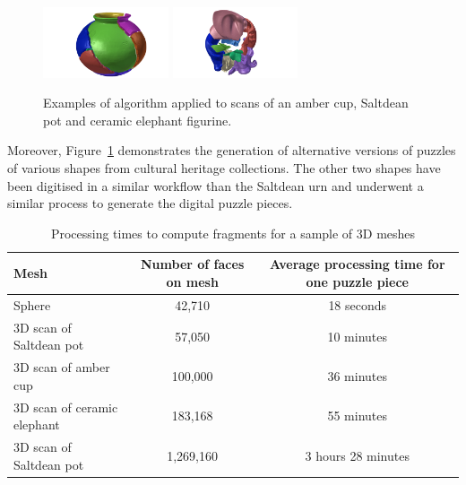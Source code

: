\documentclass[acmlarge,screen,dvipsnames]{acmart}
\begin{document}
\begin{figure}[htb]
  \includegraphics[width=0.33\textwidth]{images/saltdeanpuzzle4}%
  \includegraphics[width=0.33\textwidth]{images/elephantpuzzle4}
  \caption{\label{fig:three-shapes-with-different-fractures}%
    Examples of algorithm applied to scans of an amber cup, Saltdean pot and
    ceramic elephant figurine.}
\end{figure}

Moreover, Figure~\ref{fig:three-shapes-with-different-fractures}
demonstrates the generation of alternative versions of puzzles of
various shapes from cultural heritage collections. The other two
shapes have been digitised in a similar workflow than the Saltdean urn
and underwent a similar process to generate the digital puzzle pieces.




\begin{table}
  \centering
\greenBegin
\begin{tabular}{ |l|c|c| } 
 \hline
 Mesh & Number of faces on mesh & Average processing time for one puzzle piece
 \\ 
 \hline 
 Sphere & 42,710 & 18 seconds \\ 
 3D scan of Saltdean pot & 57,050 & 10 minutes \\ 
 3D scan of amber cup & 100,000 & 36 minutes \\ 
 3D scan of ceramic elephant & 183,168 & 55 minutes \\ 
 3D scan of Saltdean pot & 1,269,160 & 3 hours 28 minutes \\ 
 \hline
\end{tabular}
\caption{\label{table-procesingtimes} Processing times to compute fragments for a sample of 3D meshes}
\greenEnd
\end{table}
\end{document}
